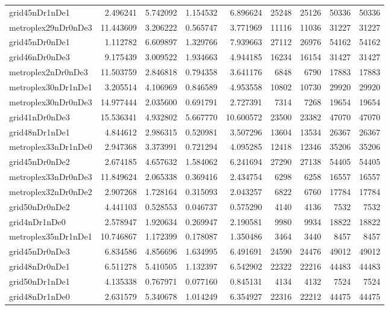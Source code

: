 \begin{longtable}{|l|r|r|r|r|r|r|r|r|}
grid45nDr1nDe1 & 2.496241 & 5.742092 & 1.154532 & 6.896624 & 25248 & 25126 & 50336 & 50336 \\
metroplex29nDr0nDe3 & 11.443609 & 3.206222 & 0.565747 & 3.771969 & 11116 & 11036 & 31227 & 31227 \\
grid45nDr0nDe1 & 1.112782 & 6.609897 & 1.329766 & 7.939663 & 27112 & 26976 & 54162 & 54162 \\
grid46nDr0nDe3 & 9.175439 & 3.009522 & 1.934663 & 4.944185 & 16234 & 16154 & 31427 & 31427 \\
metroplex2nDr0nDe3 & 11.503759 & 2.846818 & 0.794358 & 3.641176 & 6848 & 6790 & 17883 & 17883 \\
metroplex30nDr1nDe1 & 3.205514 & 4.106969 & 0.846589 & 4.953558 & 10802 & 10730 & 29920 & 29920 \\
metroplex30nDr0nDe3 & 14.977444 & 2.035600 & 0.691791 & 2.727391 & 7314 & 7268 & 19654 & 19654 \\
grid41nDr0nDe3 & 15.536341 & 4.932802 & 5.667770 & 10.600572 & 23500 & 23382 & 47070 & 47070 \\
grid48nDr1nDe1 & 4.844612 & 2.986315 & 0.520981 & 3.507296 & 13604 & 13534 & 26367 & 26367 \\
metroplex33nDr1nDe0 & 2.947368 & 3.373991 & 0.721294 & 4.095285 & 12418 & 12346 & 35206 & 35206 \\
grid45nDr0nDe2 & 2.674185 & 4.657632 & 1.584062 & 6.241694 & 27290 & 27138 & 54405 & 54405 \\
metroplex33nDr0nDe3 & 11.849624 & 2.065338 & 0.369416 & 2.434754 & 6298 & 6258 & 16557 & 16557 \\
metroplex32nDr0nDe2 & 2.907268 & 1.728164 & 0.315093 & 2.043257 & 6822 & 6760 & 17784 & 17784 \\
grid50nDr0nDe2 & 4.441103 & 0.528553 & 0.046737 & 0.575290 & 4140 & 4136 & 7532 & 7532 \\
grid4nDr1nDe0 & 2.578947 & 1.920634 & 0.269947 & 2.190581 & 9980 & 9934 & 18822 & 18822 \\
metroplex35nDr1nDe1 & 10.746867 & 1.172399 & 0.178087 & 1.350486 & 3464 & 3440 & 8457 & 8457 \\
grid45nDr0nDe3 & 6.834586 & 4.856696 & 1.634995 & 6.491691 & 24590 & 24476 & 49012 & 49012 \\
grid48nDr0nDe1 & 6.511278 & 5.410505 & 1.132397 & 6.542902 & 22322 & 22216 & 44483 & 44483 \\
grid50nDr1nDe1 & 4.135338 & 0.767971 & 0.077160 & 0.845131 & 4134 & 4132 & 7524 & 7524 \\
grid48nDr1nDe0 & 2.631579 & 5.340678 & 1.014249 & 6.354927 & 22316 & 22212 & 44475 & 44475 \\

\end{longtable}
